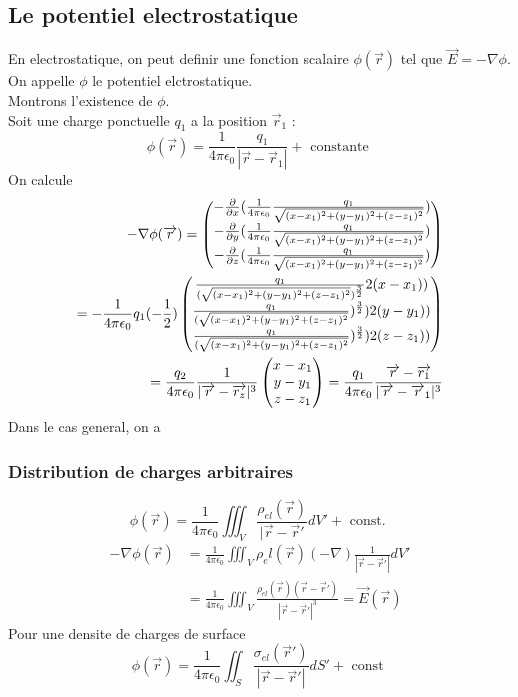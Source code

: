 \documentclass[../main.tex]{subfiles}
\begin{document}
\subsection{Le potentiel electrostatique}
En electrostatique, on peut definir une fonction scalaire $\phi( \vec{r}) $ tel que $\vec{E} = - \nabla \phi$. 
On appelle $\phi$ le potentiel elctrostatique.\\
Montrons l'existence de $\phi$.\\
Soit une charge ponctuelle $q_1$ a la position $\vec{r}_1$ :
\[ 
	\phi( \vec{r}) = \frac{1}{4 \pi \epsilon_0} \frac{q_1}{|\vec{r}-\vec{r}_1|} + \text{ constante } 
\]
On calcule
\begin{align*}
- \nabla \phi( \overrightarrow{r}) = 
\begin{pmatrix}
	- \frac{\partial}{\partial x} ( \frac{1}{4 \pi \epsilon_0} \frac{q_1}{ \sqrt{( x-x_1) ^{2} + ( y-y_1) ^{2} + ( z-z_1) ^{2}} }) \\
	- \frac{\partial}{\partial y} ( \frac{1}{4 \pi \epsilon_0} \frac{q_1}{ \sqrt{( x-x_1) ^{2} + ( y-y_1) ^{2} + ( z-z_1) ^{2}} }) \\
	- \frac{\partial}{\partial z} ( \frac{1}{4 \pi \epsilon_0} \frac{q_1}{ \sqrt{( x-x_1) ^{2} + ( y-y_1) ^{2} + ( z-z_1) ^{2}} }) 
\end{pmatrix}\\
= 
- \frac{1}{4 \pi \epsilon_0}q_1 ( -\frac{1}{2}) 
\begin{pmatrix}
	\frac{q_1}{ ( \sqrt{( x-x_1) ^{2} + ( y-y_1) ^{2} + ( z-z_1) ^{2}})^{\frac{3}{2}} }  2 ( x-x_1) )\\
	\frac{q_1}{ ( \sqrt{( x-x_1) ^{2} + ( y-y_1) ^{2} + ( z-z_1) ^{2}} })^{\frac{3}{2}} ) 2 ( y-y_1) )\\
	\frac{q_1}{ ( \sqrt{( x-x_1) ^{2} + ( y-y_1) ^{2} + ( z-z_1) ^{2}} } )^{\frac{3}{2}}) 2 ( z-z_1) )
\end{pmatrix}\\
=
\frac{q_2}{4\pi \epsilon_0} \frac{1}{|\overrightarrow{r}-\overrightarrow{r_z}|^{3}}
\begin{pmatrix}
x-x_1\\
y-y_1\\
z-z_1
\end{pmatrix}
=  \frac{q_1}{4 \pi \epsilon_0} \frac{ \overrightarrow{r}-\overrightarrow{r_1}}{| \overrightarrow{r}-\overrightarrow{r}_1|^{3}}
\end{align*}
Dans le cas general, on a
\subsubsection*{Distribution de charges arbitraires}
\[ 
	\phi( \vec{r}) = \frac{1}{4 \pi \epsilon_0} \iiint_{V}  \frac{\rho_{el} ( \vec{r}) }{|\vec{r}-\vec{r}'} dV' + \text{ const. } 
\]
\begin{align*}
	- \nabla \phi( \vec{r})  &= \frac{1}{4 \pi \epsilon_0} \iiint_{V}  \rho_el( \vec{r}) ( -\nabla)  \frac{1}{|\vec{r}-\vec{r}'|} dV'\\
				 &= \frac{1}{4 \pi \epsilon_0} \iiint_{V}  \frac{ \rho_{el} ( \vec{r}) ( \vec{r}-\vec{r}') }{|\vec{r}-\vec{r}'|^{3}}= \vec{E}( \vec{r}) 
\end{align*}
Pour une densite de charges de surface
\[ 
	\phi ( \vec{r})  = \frac{1}{ 4 \pi \epsilon_0} \iint_{S}  \frac{\sigma_{el} ( \vec{r}') }{|\vec{r}-\vec{r}'|} dS' + \text{ const } 
\]
\end{document}
